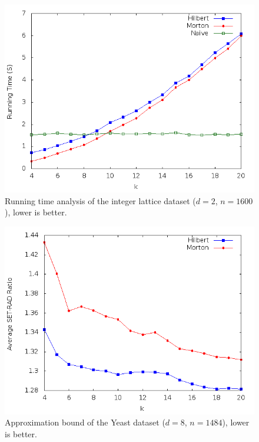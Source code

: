 \documentclass[10pt]{article}
\begin{document}
\begin{figure}
\begin{center}
\includegraphics[scale=0.5]{LatGra.png}
\caption{Running time analysis of the integer lattice dataset ($d = 2$, $n = 1600$), lower is better.}
\label{run-lattice}
\end{center}
\end{figure}

\begin{figure}
\begin{center}
\includegraphics[scale=0.5]{YeaGra2.png}
\caption{Approximation bound of the Yeast dataset ($d = 8$, $n = 1484$), lower is better.}
\label{approx-yeast}
\end{center}
\end{figure}
\end{document}
